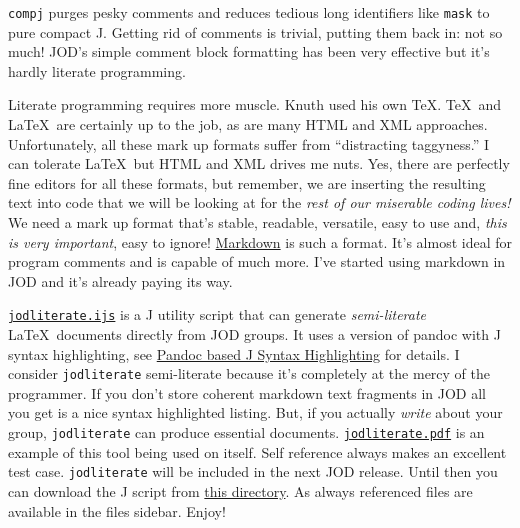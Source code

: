 \small
\begin{Shaded}
\begin{Highlighting}[]
   \FunctionTok{;}\FunctionTok{\{} 
\AlertTok{=:}\OtherTok{:}
\RegionMarkerTok{((}\FunctionTok{-#}\RegionMarkerTok{)(}\RegionMarkerTok{)}\RegionMarkerTok{)}
\FunctionTok{~:}\OtherTok{/\textbackslash{}}
\RegionMarkerTok{(}\FunctionTok{#}\RegionMarkerTok{)}\FunctionTok{<}\FunctionTok{#}
\RegionMarkerTok{)}
\end{Highlighting}
\end{Shaded}
\normalsize

\texttt{compj} purges pesky comments and reduces tedious long
identifiers like \texttt{mask} to pure compact J. Getting rid of
comments is trivial, putting them back in: not so much! JOD's simple
comment block formatting has been very effective but it's hardly
literate programming.

Literate programming requires more muscle. Knuth used his own \TeX. \TeX\
and \LaTeX\ are certainly up to the job, as are many HTML and XML
approaches. Unfortunately, all these mark up formats suffer from
``distracting taggyness.'' I can tolerate \LaTeX\ but HTML and XML drives
me nuts. Yes, there are perfectly fine editors for all these formats, but
remember, we are inserting the resulting text into code that we will be
looking at for the \emph{rest of our miserable coding lives!} We need a
mark up format that's stable, readable, versatile, easy to use and,
\emph{this is very important}, easy to ignore!
\href{http://daringfireball.net/projects/markdown/}{Markdown} is such a
format. It's almost ideal for program comments and is capable of much
more. I've started using markdown in JOD and it's already paying its
way.

\href{https://www.box.com/s/1fcil5s5zhvlxzzwpjqn}{\texttt{jodliterate.ijs}}
is a J utility script that can generate \emph{semi-literate} \LaTeX\
documents directly from JOD groups. It uses a version of pandoc with J
syntax highlighting, see
\href{http://bakerjd99.wordpress.com/2012/09/20/pandoc-based-j-syntax-highlighting/}{Pandoc
based J Syntax Highlighting} for details. I consider
\texttt{jodliterate} semi-literate because it's completely at the mercy
of the programmer. If you don't store coherent markdown text fragments
in JOD all you get is a nice syntax highlighted listing. But, if you
actually \emph{write} about your group, \texttt{jodliterate} can produce
essential documents.
\href{https://www.box.com/s/rhs9kfmim65vm6sv5p8y}{\texttt{jodliterate.pdf}}
is an example of this tool being used on itself. Self reference always
makes an excellent test case. \texttt{jodliterate} will be included in
the next JOD release. Until then you can download the J script from
\href{https://www.box.com/s/eb537470b25ab230a0ab}{this directory}. As always
referenced files are available in the files sidebar. Enjoy!

